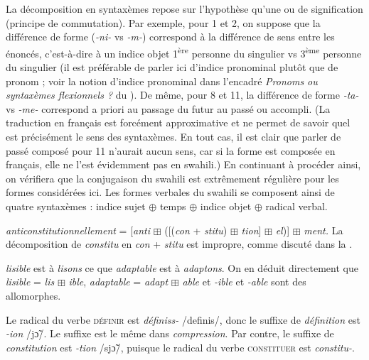 {     La décomposition en syntaxèmes repose sur l’hypothèse qu’une  ou de signification (principe de commutation). Par exemple, pour 1 et 2, on suppose que la différence de forme (\textit{{}-ni-} vs \textit{{}-m-}) correspond à la différence de sens entre les énoncés, c’est-à-dire à un indice objet 1\textsuperscript{ère} personne du singulier vs 3\textsuperscript{ème} personne du singulier (il est préférable de parler ici d’indice pronominal plutôt que de pronom ; voir la notion d’indice pronominal dans l’encadré \textit{Pronoms ou syntaxèmes flexionnels ?} du ). De même, pour 8 et 11, la différence de forme \textit{{}-ta-} vs \textit{{}-me-} correspond a priori au passage du futur au passé ou accompli. (La traduction en français est forcément approximative et ne permet de savoir quel est précisément le sens des syntaxèmes. En tout cas, il est clair que parler de passé composé pour 11 n’aurait aucun sens, car si la forme est composée en français, elle ne l’est évidemment pas en swahili.) En continuant à procéder ainsi, on vérifiera que la conjugaison du swahili est extrêmement régulière pour les formes considérées ici. Les formes verbales du swahili se composent ainsi de quatre syntaxèmes : indice sujet \textrm{${\oplus}$} temps \textrm{${\oplus}$} indice objet \textrm{${\oplus}$} radical verbal.

     \textit{anticonstitutionnellement} = [\textit{anti} \textrm{${\boxplus}$} ([(\textit{con} + \textit{stitu}) \textrm{${\boxplus}$} \textit{tion}] \textrm{${\boxplus}$} \textit{el})] \textrm{${\boxplus}$} \textit{ment.} La décomposition de \textit{constitu} en \textit{con} + \textit{stitu} est impropre, comme discuté dans la .

     \textit{lisible} est à \textit{lisons} ce que \textit{adaptable} est à \textit{adaptons}. On en déduit directement que \textit{lisible} = \textit{lis} \textrm{${\boxplus}$} \textit{ible}, \textit{adaptable} = \textit{adapt} \textrm{${\boxplus}$} \textit{able} et \textit{{}-ible} et \textit{{}-able} sont des allomorphes.

     Le radical du verbe \textsc{définir} est \textit{définiss-} /definis/, donc le suffixe de \textit{définition} est \textit{{}-ion} /j\~{ɔ}/. Le suffixe est le même dans \textit{compression}. Par contre, le suffixe de \textit{constitution} est \textit{{}-tion} /sj\~{ɔ}/, puisque le radical du verbe \textsc{constituer} est \textit{constitu-}.

}
